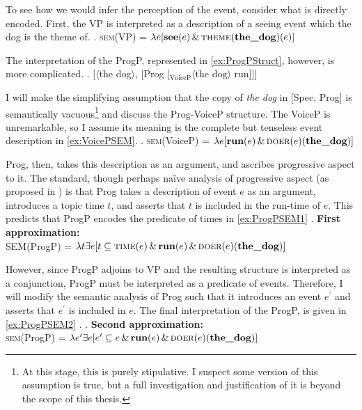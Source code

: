 \documentclass[MilwayThesis]{subfiles}
\begin{document}
To see how we would infer the perception of the event, consider what is directly encoded.
First, the VP is interpreted as a description of a seeing event which the dog is the theme of.
\ex.\label{ex:VPSEM} \textsc{sem}(VP) = $\lambda e [\textbf{see}(e)\,\&\,\textsc{theme}(\textbf{the\_dog})(e)]$

The interpretation of the ProgP, represented in \cref{ex:ProgPStruct}, however, is more complicated.
\ex.\label{ex:ProgPStruct} [$\langle$the dog$\rangle$, [Prog [$_\text{VoiceP} \langle\text{the dog}\rangle$ run]]]

I will make the simplifying assumption that the copy of \textit{the dog} in [Spec, Prog] is semantically vacuous\footnote{
	At this stage, this is purely stipulative.
	I suspect some version of this assumption is true, but a full investigation and justification of it is beyond the scope of this thesis.
} and discuss the Prog-VoiceP structure.
The VoiceP is unremarkable, so I assume its meaning is the complete but tenseless event description in \cref{ex:VoicePSEM}.
\ex.\label{ex:VoicePSEM} \textsc{sem}(VoiceP) = $\lambda e [\textbf{run}(e)\,\&\,\textsc{doer}(e)(\textbf{the\_dog})]$

Prog, then, takes this description as an argument, and ascribes progressive aspect to it.
The standard, though perhaps na\"ive analysis of progressive aspect (as proposed in \cite{klein1994time}) is that Prog takes a description of event $e$ as an argument, introduces a topic time $t$, and asserts that $t$ is included in the run-time of $e$.
This predicts that ProgP encodes the predicate of times in \cref{ex:ProgPSEM1}
\ex.\label{ex:ProgPSEM1} \textbf{First approximation:}\\\textsc{SEM}(ProgP) =  $\lambda t \exists e [t \subseteq \textsc{time}(e)\,\&\,\textbf{run}(e)\,\&\,\textsc{doer}(e)(\textbf{the\_dog})]$

However, since ProgP adjoins to VP and the resulting structure is interpreted as a conjunction, ProgP must be interpreted as a predicate of events.
Therefore, I will modify the semantic analysis of Prog such that it introduces an event $e^{\prime}$ and asserts that $e^{\prime}$ is included in $e$.
The final interpretation of the ProgP, is given in \cref{ex:ProgPSEM2} \parencite[cf.][]{bjorkman2018poster}.
\ex.\label{ex:ProgPSEM2} \textbf{Second approximation:}\\\textsc{sem}(ProgP) =  $\lambda e^{\prime} \exists e [e^{\prime} \subseteq e\,\&\,\textbf{run}(e)\,\&\,\textsc{doer}(e)(\textbf{the\_dog})]$
\end{document}
